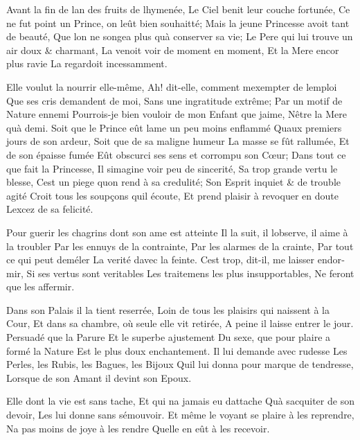 \documentclass[14pt,a4paper]{memoir}
\begin{document}
{{\begin{otherlanguage}{french}
{Avant la fin de l\textquotesingle an des fruits de
l\textquotesingle hymenée,} {Le Ciel benit leur couche fortunée,} {Ce ne
fut point un Prince, on l\textquotesingle eût bien souhaitté;} {Mais la
jeune Princesse avoit tant de beauté,} {Que l\textquotesingle on ne
songea plus qu\textquotesingle à conserver sa vie;} {Le Pere qui lui
trouve un air doux \& charmant,} {La venoit voir de moment en moment,}
{Et la Mere encor plus ravie} {La regardoit incessamment.}

{Elle voulut la nourrir elle-même,} {Ah! dit-elle, comment
m\textquotesingle exempter de l\textquotesingle emploi} {Que ses cris
demandent de moi,} {Sans une ingratitude extrême;} {Par un motif de
Nature ennemi} {Pourrois-je bien vouloir de mon Enfant que
j\textquotesingle aime,} {N\textquotesingle être la Mere
qu\textquotesingle à demi.} {Soit que le Prince eût
l\textquotesingle ame un peu moins enflammé} {Qu\textquotesingle aux
premiers jours de son ardeur,} {Soit que de sa maligne humeur} {La masse
se fût rallumée,} {Et de son épaisse fumée} {Eût obscurci ses sens et
corrompu son Cœur; } {Dans tout ce que fait la Princesse,} {Il
s\textquotesingle imagine voir peu de sincerité,} {Sa trop grande vertu
le blesse,} {C\textquotesingle est un piege qu\textquotesingle on rend à
sa credulité;} {Son Esprit inquiet \& de trouble agité} {Croit tous les
soupçons qu\textquotesingle il écoute,} {Et prend plaisir à revoquer en
doute} {L\textquotesingle excez de sa felicité.}

{Pour guerir les chagrins dont son ame est atteinte} {Il la suit, il
l\textquotesingle observe, il aime à la troubler } {Par les ennuys de la
contrainte,} {Par les alarmes de la crainte,} {Par tout ce qui peut
deméler} {La verité d\textquotesingle avec la feinte.}
{C\textquotesingle est trop, dit-il, me laisser endormir,} {Si ses
vertus sont veritables} {Les traitemens les plus insupportables,} {Ne
feront que les affermir.}

{Dans son Palais il la tient reserrée,} {Loin de tous les plaisirs qui
naissent à la Cour, } {Et dans sa chambre, où seule elle vit retirée,}
{A peine il laisse entrer le jour.} {Persuadé que la Parure} {Et le
superbe ajustement} {Du sexe, que pour plaire a formé la Nature} {Est le
plus doux enchantement.} {Il lui demande avec rudesse} {Les Perles, les
Rubis, les Bagues, les Bijoux} {Qu\textquotesingle il lui donna pour
marque de tendresse,} {Lorsque de son Amant il devint son Epoux.}

{Elle dont la vie est sans tache,} {Et qui n\textquotesingle a jamais eu
d\textquotesingle attache} {Qu\textquotesingle à
s\textquotesingle acquiter de son devoir,} {Les lui donne sans
s\textquotesingle émouvoir.} {Et même le voyant se plaire à les
reprendre,} {N\textquotesingle a pas moins de joye à les rendre}
{Qu\textquotesingle elle en eût à les recevoir.}


\end{otherlanguage}}}
\end{document}
